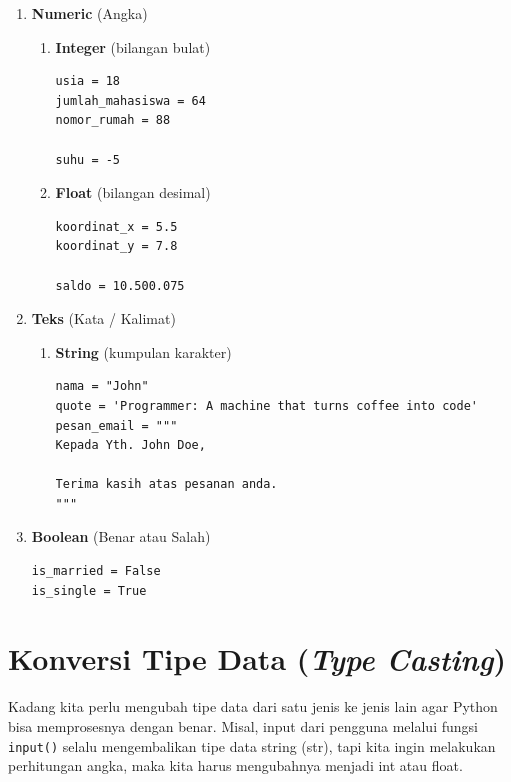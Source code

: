 \begin{enumerate}
\item \textbf{Numeric} (Angka)
\begin{enumerate}
\item \textbf{Integer} (bilangan bulat)
\begin{lstlisting}[style=PythonStyle]
usia = 18
jumlah_mahasiswa = 64
nomor_rumah = 88

suhu = -5
\end{lstlisting}

\item \textbf{Float} (bilangan desimal)
\begin{lstlisting}[style=PythonStyle]
koordinat_x = 5.5
koordinat_y = 7.8

saldo = 10.500.075
\end{lstlisting}
\end{enumerate}

\item \textbf{Teks} (Kata / Kalimat)
\begin{enumerate}
\item \textbf{String} (kumpulan karakter)
\begin{lstlisting}[style=PythonStyle]
nama = "John"
quote = 'Programmer: A machine that turns coffee into code'
pesan_email = """
Kepada Yth. John Doe,

Terima kasih atas pesanan anda.
"""
\end{lstlisting}
\end{enumerate}

\item \textbf{Boolean} (Benar atau Salah)
\begin{lstlisting}[style=PythonStyle]
is_married = False
is_single = True
\end{lstlisting}
\end{enumerate}

\section{Konversi Tipe Data (\textit{Type Casting})}

Kadang kita perlu mengubah tipe data dari satu jenis ke jenis lain agar Python bisa memprosesnya dengan benar.
Misal, input dari pengguna melalui fungsi \texttt{input()} selalu mengembalikan tipe data string (str), tapi kita ingin melakukan perhitungan angka, maka kita harus mengubahnya menjadi int atau float.

